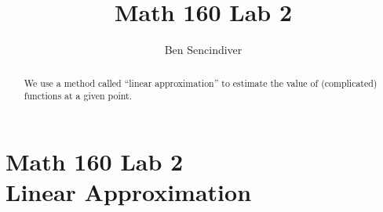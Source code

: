 \documentclass{ximera}
\title{Math 160 Lab 2}
\author{Ben Sencindiver}
\begin{document}
\begin{abstract}
We use a method called ``linear approximation'' to estimate the value
of (complicated) functions at a given point.
\end{abstract}

\maketitle

\section{Math 160 Lab 2 \\ Linear Approximation}

\lipsum[2-4]
\end{document}
